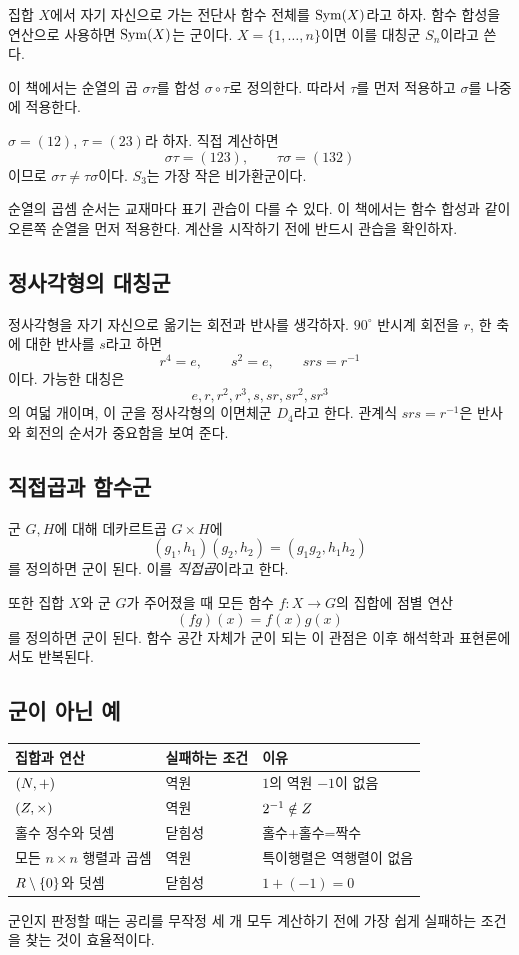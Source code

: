 집합 $X$에서 자기 자신으로 가는 전단사 함수 전체를 $\operatorname{Sym}(X)$라고 하자. 함수 합성을 연산으로 사용하면 $\operatorname{Sym}(X)$는 군이다. $X=\{1,\dots,n\}$이면 이를 대칭군 $S_n$이라고 쓴다.

이 책에서는 순열의 곱 $\sigma\tau$를 합성 $\sigma\circ\tau$로 정의한다. 따라서 $\tau$를 먼저 적용하고 $\sigma$를 나중에 적용한다.

\begin{example}[$S_3$의 비가환성]
$\sigma=(12)$, $\tau=(23)$라 하자. 직접 계산하면
\[
  \sigma\tau=(123),\qquad \tau\sigma=(132)
\]
이므로 $\sigma\tau\ne\tau\sigma$이다. $S_3$는 가장 작은 비가환군이다.
\end{example}

\begin{pitfall}
순열의 곱셈 순서는 교재마다 표기 관습이 다를 수 있다. 이 책에서는 함수 합성과 같이 오른쪽 순열을 먼저 적용한다. 계산을 시작하기 전에 반드시 관습을 확인하자.
\end{pitfall}

\subsection{정사각형의 대칭군}

정사각형을 자기 자신으로 옮기는 회전과 반사를 생각하자. $90^\circ$ 반시계 회전을 $r$, 한 축에 대한 반사를 $s$라고 하면
\[
  r^4=e,\qquad s^2=e,\qquad srs=r^{-1}
\]
이다. 가능한 대칭은
\[
  e,r,r^2,r^3,s,sr,sr^2,sr^3
\]
의 여덟 개이며, 이 군을 정사각형의 이면체군 $D_4$라고 한다. 관계식 $srs=r^{-1}$은 반사와 회전의 순서가 중요함을 보여 준다.

\subsection{직접곱과 함수군}

군 $G,H$에 대해 데카르트곱 $G\times H$에
\[
  (g_1,h_1)(g_2,h_2)=(g_1g_2,h_1h_2)
\]
를 정의하면 군이 된다. 이를 \emph{직접곱}이라고 한다.

또한 집합 $X$와 군 $G$가 주어졌을 때 모든 함수 $f:X\to G$의 집합에 점별 연산
\[
  (fg)(x)=f(x)g(x)
\]
를 정의하면 군이 된다. 함수 공간 자체가 군이 되는 이 관점은 이후 해석학과 표현론에서도 반복된다.

\subsection{군이 아닌 예}

\begin{center}
\begin{tabular}{lll}
\toprule
집합과 연산 & 실패하는 조건 & 이유 \\
\midrule
$(N,+)$ & 역원 & $1$의 역원 $-1$이 없음 \\
$(Z,\times)$ & 역원 & $2^{-1}\notin Z$ \\
홀수 정수와 덧셈 & 닫힘성 & 홀수+홀수=짝수 \\
모든 $n\times n$ 행렬과 곱셈 & 역원 & 특이행렬은 역행렬이 없음 \\
$R\setminus\{0\}$와 덧셈 & 닫힘성 & $1+(-1)=0$ \\
\bottomrule
\end{tabular}
\end{center}

군인지 판정할 때는 공리를 무작정 세 개 모두 계산하기 전에 가장 쉽게 실패하는 조건을 찾는 것이 효율적이다.
